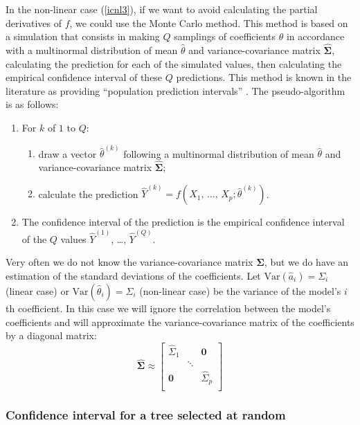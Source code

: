 In the non-linear case (\ref{icnl3}), if we want to avoid calculating the partial derivatives of $f$, we could use the Monte Carlo method. This method is based on a simulation that consists in making $Q$ samplings of coefficients 
$\theta$ in accordance with a multinormal distribution of mean $\hat{\theta}$ and variance-covariance matrix $\hat{\boldsymbol{\Sigma}}$, calculating the prediction for each of the simulated values, then calculating the empirical confidence interval of these $Q$
predictions. This method is known in the literature as providing ``population prediction intervals''
\citep{bolker08,paine12}. The pseudo-algorithm is as follows:
\begin{enumerate}
\item For $k$ of $1$ to $Q$:
    \begin{enumerate}
    \item draw a vector $\hat{\theta}^{(k)}$ following a multinormal distribution of mean $\hat{\theta}$ and variance-covariance matrix $\hat{\boldsymbol{\Sigma}}$;
    \item calculate the prediction 
    $\hat{Y}^{(k)}=f(X_1,\,\ldots,\,X_p;\hat{\theta}^{(k)})$.
    \end{enumerate}
\item The confidence interval of the prediction is the empirical confidence interval of the $Q$ values $\hat{Y}^{(1)}$, \ldots,
$\hat{Y}^{(Q)}$.
\end{enumerate}

Very often we do not know the variance-covariance matrix 
$\hat{\boldsymbol{\Sigma}}$, but we do have an estimation of the standard deviations of the coefficients. Let 
$\mathrm{Var}(\hat{a}_i)=\Sigma_i$ (linear case) or 
$\mathrm{Var}(\hat{\theta}_i)=\Sigma_i$ (non-linear case) be the variance of the model's $i$th coefficient. In this case we will ignore the correlation between the model's coefficients and will approximate the variance-covariance matrix of the coefficients by a diagonal matrix:
\[
\hat{\boldsymbol{\Sigma}}\approx\left[
\begin{array}{ccc}
\hat{\Sigma}_1 &        & \mathbf{0}\\ %
               & \ddots & \\ %
\mathbf{0}     &        & \hat{\Sigma}_p\\ %
\end{array}
\right]
\]

\subsubsection{Confidence interval for a tree selected at random}

